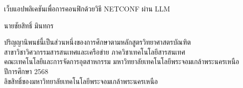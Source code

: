 \newpage
\thispagestyle{empty}
\begin{center}


เว็บแอปพลิเคชันเพื่อการคอนฟิกด้วยวิธี NETCONF ผ่าน LLM      %


\vspace{90mm}
นายชัยสิทธิ์ มินทกร %
\vspace{94mm}   



ปริญญานิพนธ์นี้เป็นส่วนหนึ่งของการศึกษาตามหลักสูตรวิทยาศาสตรบัณฑิต\\
สาขาวิชาวิศวกรรมสารสนเทศและเครือข่าย ภาควิชาเทคโนโลยีสารสนเทศ\\



คณะเทคโนโลยีและการจัดการอุตสาหกรรม มหาวิทยาลัยเทคโนโลยีพระจอมเกล้าพระนครเหนือ\\
ปีการศึกษา 2568\\
ลิขสิทธิ์ของมหาวิทยาลัยเทคโนโลยีพระจอมเกล้าพระนครเหนือ

\end{center}


